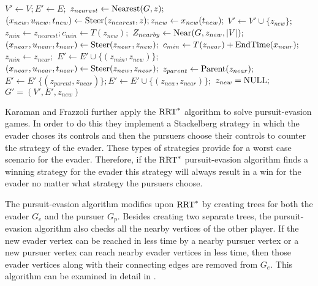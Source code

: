 \begin{algorithm}
\caption{$\textnormal{Extend}(G,z)$ \cite{karaman}}\label{extend}
\begin{algorithmic}[1]
	\State $V' \leftarrow V; E' \leftarrow E;$
	\State $z_{nearest} \leftarrow \textnormal{Nearest}(G,z);$
	\State $(x_{new},u_{new},t_{new}) \leftarrow \textnormal{Steer}(z_{nearest},z); z_{new} \leftarrow x_{new}(t_{new});$
		\State $V' \leftarrow V' \cup \{z_{new}\};$
		\State $z_{min} \leftarrow z_{nearest}; c_{min} \leftarrow T(z_{new});$
		\State $Z_{nearby} \leftarrow \textnormal{Near}(G,z_{new},|V|);$
		 \do{}
			\State $(x_{near},u_{near},t_{near}) \leftarrow \textnormal{Steer}(z_{near},z_{new});$
				\State $c_{min} \leftarrow T(z_{near})+\textnormal{EndTime}(x_{near});$
				\State $z_{min} \leftarrow z_{near};$
			\EndIf
		\EndFor
		\State $E' \leftarrow E' \cup \{(z_{min},z_{new})\};$
		 \do{}
			\State $(x_{near},u_{near},t_{near}) \leftarrow \textnormal{Steer}(z_{new},z_{near});$
				\State $z_{parent} \leftarrow \textnormal{Parent}(z_{near});$
				\State $E' \leftarrow E' \ \{(z_{parent},z_{near})\};E' \leftarrow E' \cup \{(z_{new},z_{near})\};$
			\EndIf
		\EndFor
		\Else
			\State $z_{new} = \textnormal{NULL};$
	\EndIf
	\State
	\Return $G' = (V',E',z_{new})$
\end{algorithmic}
\end{algorithm}

Karaman and Frazzoli further apply the $\textnormal{RRT}^*$ algorithm to solve pursuit-evasion games. In order to do this they implement a Stackelberg strategy in which the evader choses its controls and then the pursuers choose their controls to counter the strategy of the evader. These types of strategies provide for a worst case scenario for the evader. Therefore, if the $\textnormal{RRT}^*$ pursuit-evasion algorithm finds a winning strategy for the evader this strategy will always result in a win for the evader no matter what strategy the pursuers choose.

The pursuit-evasion algorithm modifies upon $\textnormal{RRT}^*$ by creating trees for both the evader $G_e$ and the pursuer $G_p$. Besides creating two separate trees, the pursuit-evasion algorithm also checks all the nearby vertices of the other player. If the new evader vertex can be reached in less time by a nearby pursuer vertex or a new pursuer vertex can reach nearby evader vertices in less time, then those evader vertices along with their connecting edges are removed from $G_e$. This algorithm can be examined in detail in .
         
